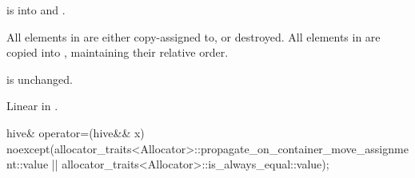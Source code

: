 \begin{itemdescr}
\pnum
\expects
{} is  into  and
.

\pnum
\effects
All elements in  are either copy-assigned to, or destroyed.
All elements in  are copied into ,
maintaining their relative order.
\begin{note}
 is unchanged.
\end{note}

\pnum
\complexity
Linear in .
\end{itemdescr}

%
\begin{itemdecl}
hive& operator=(hive&& x)
  noexcept(allocator_traits<Allocator>::propagate_on_container_move_assignment::value ||
           allocator_traits<Allocator>::is_always_equal::value);
\end{itemdecl}

